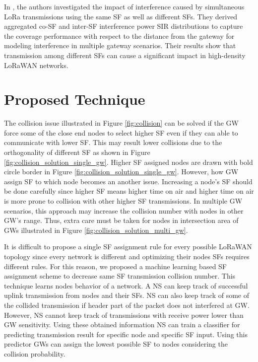 \documentclass[conference]{IEEEtran}
\begin{document}
\par In \cite{8430542}, the authors investigated the impact of interference caused by simultaneous LoRa transmissions using the same SF as well as different SFs. They derived aggregated co-SF and inter-SF interference power SIR distributions to capture the coverage performance with respect to the distance from the gateway for modeling interference in multiple gateway scenarios. Their results show that transmission among different SFs can cause a significant impact in high-density LoRaWAN networks.


\section{Proposed Technique} \label{Proposed Technique}
\par The collision issue illustrated in Figure \ref{fig:collision} can be solved if the GW force some of the close end nodes to select higher SF even if they can able to communicate with lower SF. This may result lower collisions due to the orthogonality of different SF as shown in Figure \ref{fig:collision_solution_single_gw}. Higher SF assigned nodes are drawn with bold circle border in Figure \ref{fig:collision_solution_single_gw}. However, how GW assign SF to which node becomes an another issue. Increasing a node's SF should be done carefully since higher SF means higher time on air and higher time on air is more prone to collision with other higher SF transmissions. In multiple GW scenarios, this approach may increase the collision number with nodes in other GW's range. Thus, extra care must be taken for nodes in intersection area of GWs illustrated in Figure \ref{fig:collision_solution_multi_gw}.

\par It is difficult to propose a single SF assignment rule for every possible LoRaWAN topology since every network is different and optimizing their nodes SFs requires different rules. For this reason, we proposed a machine learning based SF assignment scheme to decrease same SF transmission collision number.  This technique learns nodes behavior of a network. A NS can keep track of successful uplink transmission from nodes and their SFs. NS can also keep track of some of the collided transmission if header part of the packet does not interfered at GW. However, NS cannot keep track of transmissions with receive power lower than GW sensitivity. Using these obtained information NS can train a classifier for predicting transmission result for specific node and specific SF input. Using this predictor GWs can assign the lowest possible SF to nodes considering the collision probability.
\end{document}
